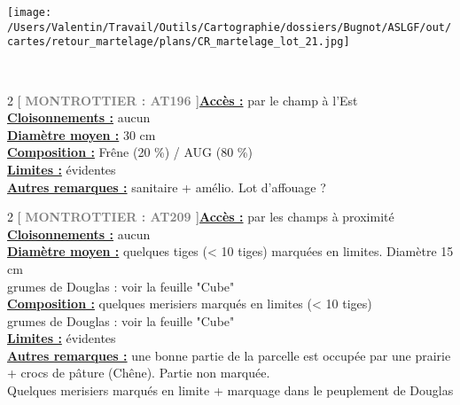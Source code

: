 \documentclass[a4paper,openany]{book}\usepackage[]{graphicx}\usepackage[]{color}
\begin{document}
\begin{center}
\texttt{[image: /Users/Valentin/Travail/Outils/Cartographie/dossiers/Bugnot/ASLGF/out/cartes/retour\_martelage/plans/CR\_martelage\_lot\_21.jpg]}
\end{center}\newpage\noindent
{}\\\begin{multicols}{2}
[
\textbf{\textcolor{gray}{
\large MONTROTTIER : AT196
}}
]\noindent\textbf{\underline{Accès :}} par le champ à l'Est\vspace{0.1cm} \\\noindent\textbf{\underline{Cloisonnements :}} aucun\vspace{0.1cm} \\\noindent\textbf{\underline{Diamètre moyen :}} 30 cm\vspace{0.1cm} \\\noindent\textbf{\underline{Composition :}} Frêne (20 \%) / AUG (80 \%)\vspace{0.1cm} \\\noindent\textbf{\underline{Limites :}} évidentes\vspace{0.1cm} \\\noindent\textbf{\underline{Autres remarques :}} sanitaire + amélio. Lot d'affouage ?\vspace{0.1cm} \\\end{multicols}\begin{multicols}{2}
[
\textbf{\textcolor{gray}{
\large MONTROTTIER : AT209
}}
]\noindent\textbf{\underline{Accès :}} par les champs à proximité\vspace{0.1cm} \\\noindent\textbf{\underline{Cloisonnements :}} aucun\vspace{0.1cm} \\\noindent\textbf{\underline{Diamètre moyen :}} quelques tiges (< 10 tiges) marquées en limites. Diamètre 15 cm \\ grumes de Douglas : voir la feuille "Cube"\vspace{0.1cm} \\\noindent\textbf{\underline{Composition :}} quelques merisiers marqués en limites (< 10 tiges) \\ grumes de Douglas : voir la feuille "Cube"\vspace{0.1cm} \\\noindent\textbf{\underline{Limites :}} évidentes\vspace{0.1cm} \\\noindent\textbf{\underline{Autres remarques :}} une bonne partie de la parcelle est occupée par une prairie + crocs de pâture (Chêne). Partie non marquée. \\ Quelques merisiers marqués en limite + marquage dans le peuplement de Douglas\vspace{0.1cm} \\\end{multicols}\begin{center}

\end{center}
\end{document}
